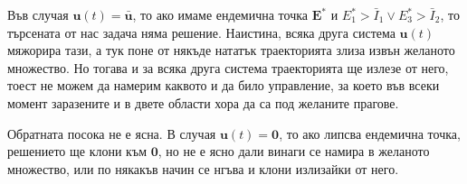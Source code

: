Във случая $\mathbf{u}(t)=\bar{\mathbf{u}}$, то ако имаме ендемична точка $\mathbf{E}^*$ и $E_1^* > \bar{I}_1 \lor E_3^* > \bar{I}_2$, то търсената от нас задача няма решение. Наистина, всяка друга система $\mathbf{u}(t)$ мяжорира тази, а тук поне от някъде нататък траекторията злиза извън желаното множество. Но тогава и за всяка друга система траекторията ще излезе от него, тоест не можем да намерим каквото и да било управление, за което във всеки момент заразените и в двете области хора да са под желаните прагове.

Обратната посока не е ясна. В случая $\mathbf{u}(t)=\mathbf{0}$, то ако липсва ендемична точка, решението ще клони към $\mathbf{0}$, но не е ясно дали винаги се намира в желаното множество, или по някакъв начин се нгъва и клони излизайки от него.


